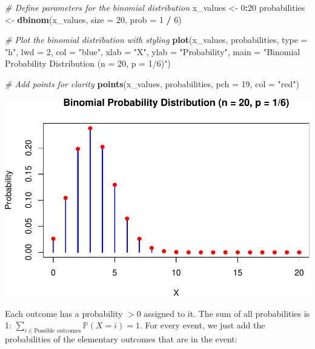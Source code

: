 \documentclass[
]{book}
\newenvironment{Shaded}{\begin{snugshade}}{\end{snugshade}}
\newcommand{\AttributeTok}[1]{\textcolor[rgb]{0.13,0.29,0.53}{#1}}
\newcommand{\CommentTok}[1]{\textcolor[rgb]{0.56,0.35,0.01}{\textit{#1}}}
\newcommand{\DecValTok}[1]{\textcolor[rgb]{0.00,0.00,0.81}{#1}}
\newcommand{\FunctionTok}[1]{\textcolor[rgb]{0.13,0.29,0.53}{\textbf{#1}}}
\newcommand{\NormalTok}[1]{#1}
\newcommand{\OtherTok}[1]{\textcolor[rgb]{0.56,0.35,0.01}{#1}}
\newcommand{\SpecialCharTok}[1]{\textcolor[rgb]{0.81,0.36,0.00}{\textbf{#1}}}
\newcommand{\StringTok}[1]{\textcolor[rgb]{0.31,0.60,0.02}{#1}}
\newcommand{\pandocbounded}[1]{#1}
\begin{document}
\begin{Shaded}
\begin{Highlighting}[]
\CommentTok{\# Define parameters for the binomial distribution}
\NormalTok{x\_values }\OtherTok{\textless{}{-}} \DecValTok{0}\SpecialCharTok{:}\DecValTok{20}
\NormalTok{probabilities }\OtherTok{\textless{}{-}} \FunctionTok{dbinom}\NormalTok{(x\_values, }\AttributeTok{size =} \DecValTok{20}\NormalTok{, }\AttributeTok{prob =} \DecValTok{1} \SpecialCharTok{/} \DecValTok{6}\NormalTok{)}

\CommentTok{\# Plot the binomial distribution with styling}
\FunctionTok{plot}\NormalTok{(x\_values, probabilities, }\AttributeTok{type =} \StringTok{"h"}\NormalTok{, }\AttributeTok{lwd =} \DecValTok{2}\NormalTok{, }\AttributeTok{col =} \StringTok{"blue"}\NormalTok{,}
     \AttributeTok{xlab =} \StringTok{"X"}\NormalTok{, }\AttributeTok{ylab =} \StringTok{"Probability"}\NormalTok{,}
     \AttributeTok{main =} \StringTok{"Binomial Probability Distribution (n = 20, p = 1/6)"}\NormalTok{)}

\CommentTok{\# Add points for clarity}
\FunctionTok{points}\NormalTok{(x\_values, probabilities, }\AttributeTok{pch =} \DecValTok{19}\NormalTok{, }\AttributeTok{col =} \StringTok{"red"}\NormalTok{)}
\end{Highlighting}
\end{Shaded}

\pandocbounded{\includegraphics[keepaspectratio]{_main_files/figure-latex/unnamed-chunk-13-1.pdf}}

Each outcome has a probability \(>0\) assigned to it. The sum of all probabilities is 1: \(\sum_{i \in \text{Possible outcomes}} \mathbb{P}(X=i) = 1\).
For every event, we just add the probabilities of the elementary outcomes that are in the event:
\end{document}
